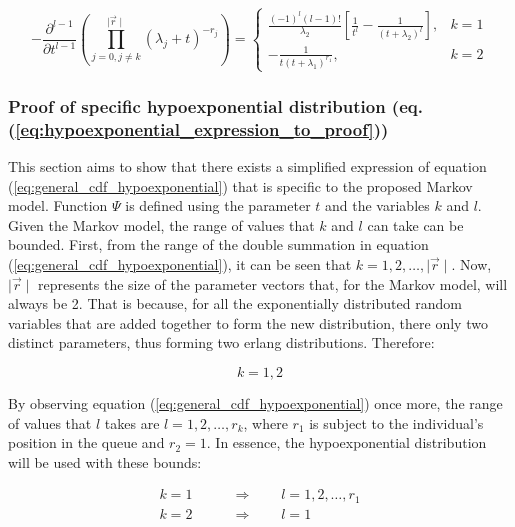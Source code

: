 \begin{equation} \label{eq:hypoexponential_expression_to_proof}
    - \frac{\partial^{l - 1}}{\partial t ^{l - 1}}
    \left(
        \prod_{j = 0, j \neq k}^{\mid \vec{r} \mid} (\lambda_j + t)^{-r_j}
    \right) =
    \begin{cases}
        \frac{(-1)^{l} (l-1)!}{\lambda_2} \left[\frac{1}{t^l} - \frac{1}
        {(t + \lambda_2)^l}\right] , & k=1 \\
        - \frac{1}{t (t + \lambda_1)^{r_1}}, & k=2
    \end{cases}
\end{equation}



\subsubsection{Proof of specific hypoexponential distribution
(eq. (\ref{eq:hypoexponential_expression_to_proof}))}

This section aims to show that there exists a simplified expression of equation
(\ref{eq:general_cdf_hypoexponential}) that is specific to the proposed Markov
model.
Function \(\Psi\) is defined using the parameter \(t\) and the variables \(k\)
and \(l\).
Given the Markov model, the range of values that \(k\) and \(l\) can take can be
bounded.
First, from the range of the double summation in equation
(\ref{eq:general_cdf_hypoexponential}), it can be seen that
\(k = 1, 2, \dots, \mid \vec{r} \mid\).
Now, \(\mid \vec{r} \mid\) represents the size of the parameter vectors that,
for the Markov model, will always be 2.
That is because, for all the exponentially distributed random variables that are
added together to form the new distribution, there only two distinct parameters,
thus forming two erlang distributions. Therefore:

\begin{equation*}
    k = 1, 2
\end{equation*}

By observing equation (\ref{eq:general_cdf_hypoexponential}) once more, the range
of values that \(l\) takes are \(l = 1, 2, \dots, r_k\), where \(r_1\) is
subject to the individual's position in the queue and \(r_2 = 1\).
In essence, the hypoexponential distribution will be used with these bounds:

\begin{align}
    k = 1 & \qquad \Rightarrow \qquad l = 1, 2, \dots, r_1 \nonumber \\
    k = 2 & \qquad \Rightarrow \qquad l = 1
\end{align}

